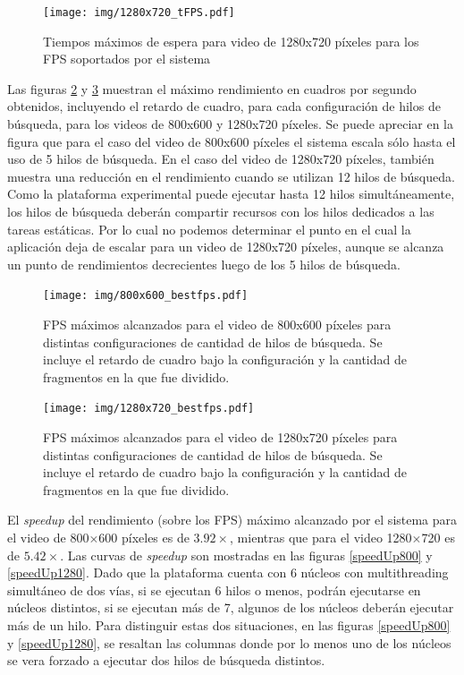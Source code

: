 \begin{figure}[!htb]

	\texttt{[image: img/1280x720\_tFPS.pdf]}
	\caption{Tiempos máximos de espera para video de 1280x720 píxeles para
	los FPS soportados por el sistema}
	\label{1280tFPS}

\end{figure}

Las figuras \ref{bestFPS800} y \ref{bestFPS1280} muestran el máximo rendimiento
en cuadros por segundo obtenidos, incluyendo el retardo de cuadro, para cada
configuración de hilos de búsqueda, para los videos de 800x600 y 1280x720
píxeles. Se puede apreciar en la figura que para el caso del video de 800x600
píxeles el sistema escala sólo hasta el uso de 5 hilos de búsqueda. En el caso
del video de 1280x720 píxeles, también muestra una reducción en el rendimiento
cuando se utilizan 12 hilos de búsqueda. Como la plataforma experimental puede
ejecutar hasta 12 hilos simultáneamente, los hilos de búsqueda deberán compartir
recursos con los hilos dedicados a las tareas estáticas. Por lo cual no podemos
determinar el punto en el cual la aplicación deja de escalar para un video de
1280x720 píxeles, aunque se alcanza un punto de rendimientos decrecientes luego
de los 5 hilos de búsqueda.

\begin{figure}[!htb]

	\texttt{[image: img/800x600\_bestfps.pdf]}
	\caption{FPS máximos alcanzados para el video de 800x600 píxeles para
	distintas configuraciones de cantidad de hilos de búsqueda. Se incluye
	el retardo de cuadro bajo la configuración y la cantidad de fragmentos
	en la que fue dividido.} \label{bestFPS800}

\end{figure}

\begin{figure}[!htb]

	\texttt{[image: img/1280x720\_bestfps.pdf]}
	\caption{FPS máximos alcanzados para el video de 1280x720 píxeles para
	distintas configuraciones de cantidad de hilos de búsqueda. Se incluye
	el retardo de cuadro bajo la configuración y la cantidad de fragmentos
	en la que fue dividido.}
	\label{bestFPS1280}

\end{figure}

El \emph{speedup} del rendimiento (sobre los FPS) máximo alcanzado por el
sistema para el video de 800$\times$600 píxeles es de $3.92\times$, mientras que
para el video 1280$\times$720 es de $5.42\times$. Las curvas de \emph{speedup}
son mostradas en las figuras \ref{speedUp800} y \ref{speedUp1280}. Dado que la
plataforma cuenta con 6 núcleos con multithreading simultáneo de dos vías, si se
ejecutan 6 hilos o menos, podrán ejecutarse en núcleos distintos, si se ejecutan
más de 7, algunos de los núcleos deberán ejecutar más de un hilo. Para
distinguir estas dos situaciones, en las figuras \ref{speedUp800} y
\ref{speedUp1280}, se resaltan las columnas donde por lo menos uno de los
núcleos se vera forzado a ejecutar dos hilos de búsqueda distintos.


